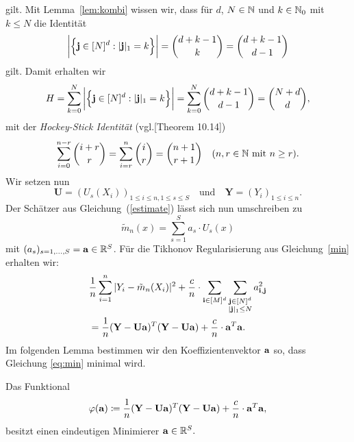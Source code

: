 gilt. Mit Lemma~\ref{lem:kombi} wissen wir, dass für $d$, $N \in \mathbb{N}$ und $k \in \mathbb{N}_0$ mit $k \leq N$ die Identität
$$\bigg|\Bigl\{\mathbf{j} \in [N]^d : |\mathbf{j}|_1 = k \Bigr\}\bigg| = \binom{d + k - 1}{k} = \binom{d + k - 1}{d - 1}$$ gilt.
Damit erhalten wir
$$H = \sum_{k = 0}^N \bigg|\Bigl\{\mathbf{j} \in [N]^d : |\mathbf{j}|_1 = k \Bigr\}\bigg|= \sum_{k = 0}^N \binom{d + k - 1}{d - 1} = \binom{N + d}{d},$$
mit der \emph{Hockey-Stick Identität} (vgl.\@ \cite{tollerproofs}[Theorem 10.14]) 
$$\sum_{i = 0}^{n-r} \binom{i + r}{r} = \sum_{i = r}^n \binom{i}{r} = \binom{n + 1}{r + 1} \quad (n, r \in \mathbb{N}  \text{ mit  } n \geq r).$$
Wir setzen nun 
$$ \mathbf{U} = (U_s(X_i))_{1\leq i \leq n,1\leq s \leq S} \quad \text{und} \quad \mathbf{Y} = (Y_i)_{1 \leq i \leq n}.$$
Der Schätzer aus Gleichung~(\ref{estimate}) lässt sich nun umschreiben zu 
\begin{equation}
\label{umschreiben}
\tilde{m}_n(x) = \sum_{s = 1}^S a_s \cdot U_s(x)
\end{equation}
mit $(a_s)_{s = 1,\dots,S} = \mathbf{a}\in \mathbb{R}^S$.
Für die Tikhonov Regularisierung aus Gleichung~\eqref{min} erhalten wir:
\begin{equation}
\label{eq:min}
\begin{split}
& \frac{1}{n} \sum_{i = 1}^n|Y_i - \tilde{m}_n(X_i)|^2 + \frac{c}{n} \cdot \sum_{\mathbf{i} \in [M]^d} \sum_{\substack{\mathbf{j} \in [N]^d\\|\mathbf{j}|_1 \leq N}} a_{\mathbf{i},\mathbf{j}}^2 \\
& = \frac{1}{n}(\mathbf{Y} - \mathbf{U}\mathbf{a})^T(\mathbf{Y} - \mathbf{U}\mathbf{a}) + \frac{c}{n} \cdot \mathbf{a}^T\mathbf{a}.
\end{split}
\end{equation}
Im folgenden Lemma bestimmen wir den Koeffizientenvektor $\mathbf{a}$ so, dass Gleichung \eqref{eq:min} minimal wird.
\begin{lem}
\label{mincoef}
Das Funktional 
$$
\varphi(\mathbf{a}) \coloneqq \frac{1}{n}(\mathbf{Y} - \mathbf{U}\mathbf{a})^T(\mathbf{Y} - \mathbf{U}\mathbf{a}) + \frac{c}{n} \cdot \mathbf{a}^T\mathbf{a},
$$
besitzt einen eindeutigen Minimierer $\mathbf{a} \in \mathbb{R}^S.$
\end{lem}
